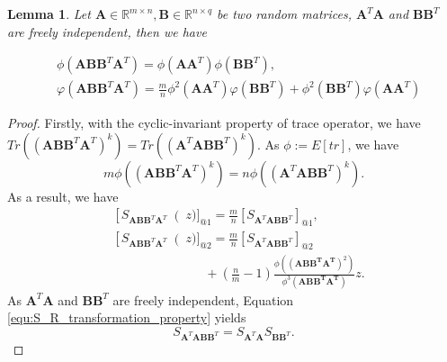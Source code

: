 \documentclass[10pt,journal,compsoc]{IEEEtran}
\newtheorem{lemma}[theorem]{Lemma}
\begin{document}
\begin{lemma}
Let $\mathbf{A}\in \mathbb{R}^{m\times n},\mathbf{B} \in \mathbb{R}^{n\times q}$ be two random matrices, $\mathbf{A}^T\mathbf{A}$ and $\mathbf{BB}^T$ are freely independent, then we have

\begin{equation}
\begin{split}
    & \phi(\mathbf{ABB}^T\mathbf{A}^T) = \phi(\mathbf{AA}^T)\phi(\mathbf{BB}^T),\\
    & \varphi(\mathbf{ABB}^T\mathbf{A}^T) = \frac{m}{n}\phi^2(\mathbf{AA}^T)\varphi(\mathbf{BB}^T)\! +\! \phi^2(\mathbf{BB}^T)\varphi(\mathbf{AA}^T)
\end{split}
\end{equation}
\label{lemma:cyclic_variant}
\end{lemma}
\begin{proof}
Firstly, with the cyclic-invariant property of trace operator, we have $Tr\left((\mathbf{ABB}^T\mathbf{A}^T)^k\right)=Tr\left((\mathbf{A}^T\mathbf{ABB}^T)^k\right)$. As $\phi:=E[tr]$, we have
\begin{equation}
    m\phi\left((\mathbf{ABB}^T\mathbf{A}^T)^k\right) = n\phi\left((\mathbf{A}^T\mathbf{ABB}^T)^k\right).
\end{equation}
As a result, we have
\begin{equation}
\begin{split}
    & \left[S_{\mathbf{ABB}^T\mathbf{A}^T}\right(z)]_{@1}=\frac{m}{n}\left[S_{\mathbf{A}^T\mathbf{ABB}^T}\right]_{@1},\\
    & \left[S_{\mathbf{ABB}^T\mathbf{A}^T}\right(z)]_{@2} = \frac{m}{n}\left[ S_{\mathbf{A}^T\mathbf{ABB}^T}\right]_{@2}\\
    & ~~~~~~~~~~~~~~~~~~~~~~~~~~~~~~~~~+ \left(\frac{n}{m}-1\right)\frac{\phi((\mathbf{\mathbf{ABB}^T\mathbf{A}^T})^2)}{\phi^3(\mathbf{\mathbf{ABB}^T\mathbf{A}^T})}z.
\end{split}
\label{equ:expand_S_1_2}
\end{equation}
As $\mathbf{A}^T\mathbf{A}$ and $\mathbf{BB}^T$ are freely independent, Equation \eqref{equ:S_R_transformation_property} yields
\begin{equation}
    S_{\mathbf{A}^T\mathbf{ABB}^T} = S_{\mathbf{A}^T\mathbf{A}}S_{\mathbf{BB}^T}.
\label{equ:expand_S_3}
\end{equation}


\end{proof}
\end{document}
